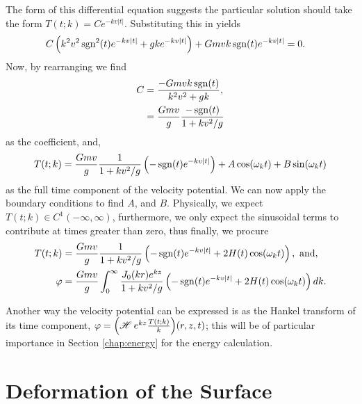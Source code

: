 The form of this differential equation suggests the particular solution should take the form $T(t;k) = C e^{-kv|t|}$. Substituting this in yields
\begin{align*}
C \left(k^2 v^2 \operatorname{sgn}^2(t) e^{-kv |t|} + gk e^{-kv |t|} \right) &+ Gmvk \operatorname{sgn}(t) e^{-kv|t|} = 0.
\end{align*}
Now, by rearranging we find
\begin{align*}
C &= \frac{-Gmvk \operatorname{sgn}(t)}{k^2v^2 + gk}, \\
&= \frac{Gmv}{g} \frac{-\operatorname{sgn}(t)}{1+kv^2/g}
\end{align*}
as the coefficient, and,
\begin{align*}
T(t;k) = \frac{Gmv}{g} \frac{1}{1+kv^2/g} \left( -\operatorname{sgn}(t) e^{-kv|t|} \right) + A \cos(\omega_k t) + B \sin(\omega_k t)
\end{align*}
as the full time component of the velocity potential. We can now apply the boundary conditions to find $A$, and $B$. Physically, we expect $T(t;k) \in C^1(-\infty,\infty)$, furthermore, we only expect the sinusoidal terms to contribute at times greater than zero, thus finally, we procure
\begin{align*}
T(t;k) &= \frac{Gmv}{g}\frac{1}{1+kv^2/g} \left(-\operatorname{sgn}(t)e^{-kv|t|} + 2H(t)\cos(\omega_k t) \right), \text{ and,} \\
\varphi &= \frac{Gmv}{g} \int_0^\infty \frac{J_0(kr)e^{kz}}{1+kv^2/g} \left(-\operatorname{sgn}(t)e^{-kv|t|} + 2H(t)\cos(\omega_k t) \right) dk.
\end{align*}

Another way the velocity potential can be expressed is as the Hankel transform of its time component, $\varphi = {\left( \operatorname{\mathscr{H}}_{} e^{kz}\frac{T(t;k)}{k} \right) }(r,z,t)$; this will be of particular importance in Section \ref{chap:energy} for the energy calculation.

\section{Deformation of the Surface}

